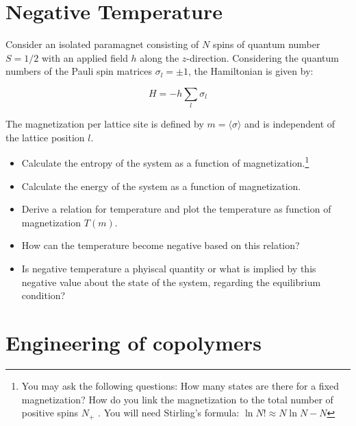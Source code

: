 \documentclass[12pt,a4paper]{article} %
\begin{document}
 
 
 \vspace{1cm}
 
 \section{ Negative Temperature}

Consider an isolated paramagnet consisting of $N$ spins of quantum number
$S = 1/2$ with an applied field $h$ along the $z$-direction. Considering the quantum numbers of the Pauli spin matrices $\sigma_l= \pm1$, the Hamiltonian is given by:

\begin{equation}
H= -h \sum_l \sigma_l
\end{equation}

The magnetization per lattice site is defined by $m = \langle \sigma \rangle$ and is independent of the lattice position $l$.

\begin{itemize}
 \item Calculate the entropy of the system as a function of magnetization.\footnote{You may ask the following questions: How many states are there for a fixed magnetization? How do you link the magnetization to the total number of positive spins $N_+$ .
 You will need Stirling's formula: $\ln N! \approx N \ln N - N$}
 \item Calculate the energy of the system as a function of magnetization.
 \item Derive a relation for temperature and plot the temperature as function of magnetization $T(m)$.
 \item How can the temperature become negative based on this relation?
 \item Is negative temperature a phyiscal quantity or what is implied by this negative value about the state of the system, regarding the equilibrium condition?
 
 \end{itemize}
 
 
\section{Engineering of copolymers}
\end{document}
